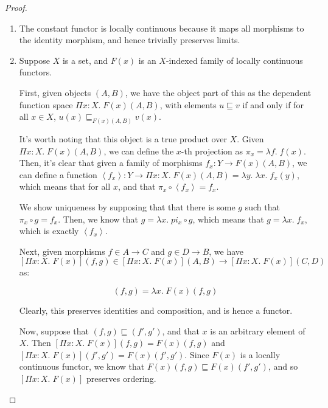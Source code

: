 \begin{proof}
\begin{enumerate}



% 
% 
% 





\item The constant functor is locally continuous because it maps all 
morphisms to the identity morphism, and hence trivially preserves 
limits. 

\item Suppose $X$ is a set, and $F(x)$ is an $X$-indexed family of
locally continuous functors. 

First, given objects $(A,B)$, we have the object part of this as the
dependent function space $\Pi x:X.\; F(x)(A,B)$, with elements $u
\sqsubseteq v$ if and only if for all $x \in X$, $u(x)
\sqsubseteq_{F(x)(A,B)} v(x)$. 

It's worth noting that this object is a true product over $X$. Given
$\Pi x:X.\; F(x)(A,B)$, we can define the $x$-th projection as $\pi_x
= \lambda f.\; f(x)$. Then, it's clear that given a family of 
morphisms $f_x : Y \to F(x)(A,B)$, we can define a function 
$\left<f_x\right> : Y \to \Pi x:X.\;F(x)(A,B) = \lambda y.\; \lambda x.\; f_x(y)$, 
which means that for all $x$, and that $\pi_x \circ \left<f_x\right> = f_x$. 

We show uniqueness by supposing that that there is some $g$ such
that $\pi_x \circ g = f_x$. Then, we know that 
$g = \lambda x.\; pi_x \circ g$, which means that $g = \lambda x.\; f_x$,
which is exactly $\left<f_x\right>$. 


Next, given morphisms $f \in A \to C$ and $g \in D \to B$, we have
$[\Pi x:X.\; F(x)](f,g) \in [\Pi x:X.\; F(x)](A,B) \to [\Pi x:X.\; F(x)](C,D)$
as:
  
\begin{displaymath}
  [\Pi x:X.\; F(x)](f,g) = \lambda x.\; F(x)(f,g)
\end{displaymath}

Clearly, this preserves identities and composition, and is hence a
functor. 

Now, suppose that $(f,g) \sqsubseteq (f',g')$, and that $x$ is an
arbitrary element of $X$. Then $[\Pi x:X.\; F(x)](f,g) = F(x)(f,g)$
and $[\Pi x:X.\; F(x)](f',g') = F(x)(f',g')$. Since $F(x)$ is a
locally continuous functor, we know that $F(x)(f,g) \sqsubseteq
F(x)(f',g')$, and so $[\Pi x:X.\; F(x)]$ preserves ordering.


\end{enumerate}
\end{proof}
